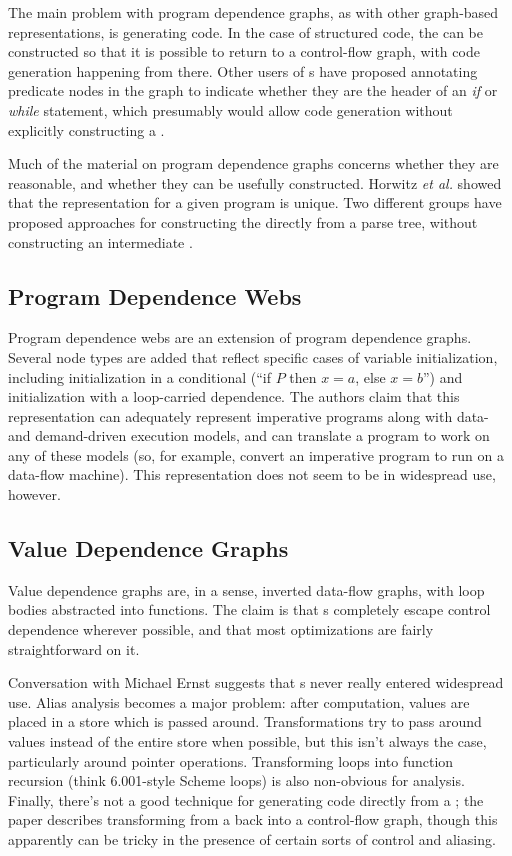 \documentclass[11pt]{article}
\begin{document}
The main problem with program dependence graphs, as with other
graph-based representations, is generating code.  In the case of
structured code, the \pdg can be constructed so that it is possible to
return to a control-flow graph, with code generation happening from
there.  Other users of \pdg{}s have proposed annotating predicate
nodes in the graph to indicate whether they are the header of an
\emph{if} or \emph{while} statement, which presumably would allow code
generation without explicitly constructing a \cfg.

Much of the material on program dependence graphs concerns whether
they are reasonable, and whether they can be usefully constructed.  
Horwitz \emph{et al.} showed that the \pdg representation for a given
program is unique\cite{pdg-unique}.  Two different groups have
proposed approaches for constructing the \pdg directly from a parse
tree, without constructing an intermediate
\cfg\cite{pdg-rest-of-us,pdg-syntax}.

\subsection{Program Dependence Webs}

Program dependence webs\cite{pdw} are an extension of program
dependence graphs.  Several node types are added that reflect specific
cases of variable initialization, including initialization in a
conditional (``if $P$ then $x=a$, else $x=b$'') and initialization
with a loop-carried dependence.  The authors claim that this
representation can adequately represent imperative programs along with
data- and demand-driven execution models, and can translate a program
to work on any of these models (so, for example, convert an imperative
program to run on a data-flow machine).  This representation does not
seem to be in widespread use, however.

\subsection{Value Dependence Graphs}

Value dependence graphs\cite{vdg} are, in a sense, inverted data-flow
graphs, with loop bodies abstracted into functions.  The claim is that
\vdg{}s completely escape control dependence wherever possible, and
that most optimizations are fairly straightforward on it.

Conversation with Michael Ernst suggests that \vdg{}s never really
entered widespread use.  Alias analysis becomes a major problem: after
computation, values are placed in a store which is passed around.
Transformations try to pass around values instead of the entire store
when possible, but this isn't always the case, particularly around
pointer operations.  Transforming loops into function recursion (think
6.001-style Scheme loops) is also non-obvious for analysis.  Finally,
there's not a good technique for generating code directly from a \vdg;
the paper describes transforming from a \vdg back into a control-flow
graph, though this apparently can be tricky in the presence of certain
sorts of control and aliasing.
\end{document}
